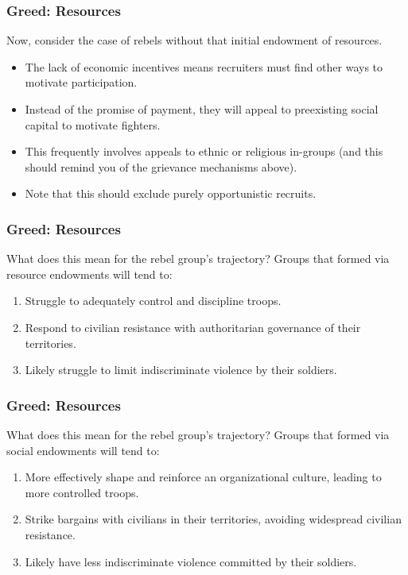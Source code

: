 \documentclass{beamer}
\begin{document}
\begin{frame} 
	\frametitle{\LARGE{Greed: Resources}}
Now, consider the case of rebels without that initial endowment of resources.
	\begin{itemize}
		\item The lack of economic incentives means recruiters must find other ways to motivate participation. \pause
		\item Instead of the promise of payment, they will appeal to preexisting social capital to motivate fighters. \pause
		\item This frequently involves appeals to ethnic or religious in-groups (and this should remind you of the grievance mechanisms above). \pause
		\item Note that this should exclude purely opportunistic recruits. 
	\end{itemize}
\end{frame}

\begin{frame} 
	\frametitle{\LARGE{Greed: Resources}}
What does this mean for the rebel group's trajectory? Groups that formed via resource endowments will tend to:
		\begin{enumerate}
			\item Struggle to adequately control and discipline troops. \pause
			\item Respond to civilian resistance with authoritarian governance of their territories. \pause
			\item Likely struggle to limit indiscriminate violence by their soldiers.
		\end{enumerate}
\end{frame}

\begin{frame} 
	\frametitle{\LARGE{Greed: Resources}}
	What does this mean for the rebel group's trajectory? Groups that formed via social endowments will tend to:
	\begin{enumerate}
		\item More effectively shape and reinforce an organizational culture, leading to more  controlled troops. \pause
		\item Strike bargains with civilians in their territories, avoiding widespread civilian resistance. \pause
		\item Likely have less indiscriminate violence committed by their soldiers.
	\end{enumerate}
\end{frame}
\end{document}

